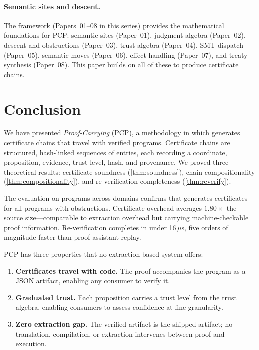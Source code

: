 \documentclass[11pt]{article}
\newcommand{\pcp}{\textsc{PCP}}           %
\begin{document}
\paragraph{Semantic sites and descent.}
The \JuGeo{} framework (Papers~01--08 in this series) provides the
mathematical foundations for \pcp{}: semantic sites (Paper~01),
judgment algebra (Paper~02), descent and obstructions (Paper~03),
trust algebra (Paper~04), SMT dispatch (Paper~05), semantic moves
(Paper~06), effect handling (Paper~07), and treaty synthesis
(Paper~08).  This paper builds on all of these to produce
certificate chains.

\section{Conclusion}\label{sec:conclusion}

We have presented \emph{Proof-Carrying \Python{}} (\pcp{}), a
methodology in which \JuGeo{} generates certificate chains that
travel with verified \Python{} programs.  Certificate chains
are structured, hash-linked sequences of entries, each recording
a coordinate, proposition, evidence, trust level, hash, and
provenance.  We proved three theoretical results: certificate
soundness (\cref{thm:soundness}), chain compositionality
(\cref{thm:compositionality}), and re-verification completeness
(\cref{thm:reverify}).

The evaluation on \expTotalPrograms{} programs across
\expDomainCount{} domains confirms that \JuGeo{} generates
certificates for all programs with \expObstructionTotal{}
obstructions.  Certificate overhead averages $1.80\times$ the
source size---comparable to extraction overhead but carrying
machine-checkable proof information.  Re-verification completes
in under 16\,$\mu$s, five orders of magnitude faster than
proof-assistant replay.

\pcp{} has three properties that no extraction-based system offers:
\begin{enumerate}
  \item \textbf{Certificates travel with code.}  The proof
    accompanies the program as a JSON artifact, enabling any
    consumer to verify it.
  \item \textbf{Graduated trust.}  Each proposition carries
    a trust level from the \JuGeo{} trust algebra, enabling
    consumers to assess confidence at fine granularity.
  \item \textbf{Zero extraction gap.}  The verified artifact is
    the shipped artifact; no translation, compilation, or
    extraction intervenes between proof and execution.
\end{enumerate}
\end{document}
